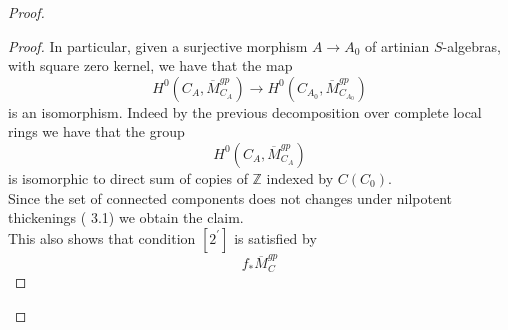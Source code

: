 \documentclass{amsart}
\theoremstyle{definition}
\numberwithin{equation}{section}
\begin{document}
\begin{proof}
\begin{proof}
\noindent In particular, given a surjective morphism $A{\rightarrow} A_0$ of artinian $S$-algebras, with square zero kernel, we have that the map
\begin{equation}\label{fdefzero}
H^0(C_{A},\overline{M}_{C_A}^{gp}){\rightarrow} H^0(C_{A_0},\overline{M}_{C_{A_0}}^{gp})
\end{equation}
\noindent is an isomorphism. Indeed by the previous decomposition over complete local rings we have that the group
$$
H^0(C_A,\overline{M}_{C_{A}}^{gp})
$$
\noindent is isomorphic to direct sum of copies of ${\mathbb{Z}}$ indexed by $C(C_0)$. \\
Since the set of connected components does not changes under nilpotent thickenings (\cite{aas} 3.1) we obtain the claim.\\

\noindent This also shows that condition $[2^{\prime}]$ is satisfied by
$$
f_{*}\overline{M}_C^{gp}
$$


\end{proof}
\end{proof}
\end{document}
